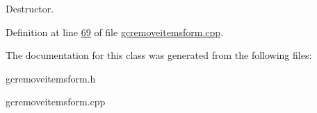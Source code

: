 \-Destructor. 



\-Definition at line \hyperlink{gcremoveitemsform_8cpp_source_l00069}{69} of file \hyperlink{gcremoveitemsform_8cpp_source}{gcremoveitemsform.\-cpp}.



\-The documentation for this class was generated from the following files\-:\begin{DoxyCompactItemize}
\item 
gcremoveitemsform.\-h\item 
gcremoveitemsform.\-cpp\end{DoxyCompactItemize}

